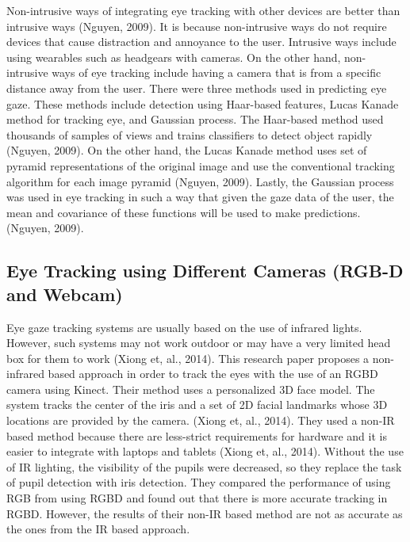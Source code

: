 Non-intrusive ways of integrating eye tracking with other devices are better than intrusive ways (Nguyen, 2009). It is because non-intrusive ways do not require devices that cause distraction and annoyance to the user. Intrusive ways include using wearables such as headgears with cameras. On the other hand, non-intrusive ways of eye tracking include having a camera that is from a specific distance away from the user. There were three methods used in predicting eye gaze. These methods include detection using Haar-based features, Lucas Kanade method for tracking eye, and Gaussian process. The Haar-based method used thousands of samples of views and trains classifiers to detect object rapidly (Nguyen, 2009). On the other hand, the Lucas Kanade method uses set of pyramid representations of the original image and use the conventional tracking algorithm for each image pyramid (Nguyen, 2009). Lastly, the Gaussian process was used in eye tracking in such a way that given the gaze data of the user, the mean and covariance of these functions will be used to make predictions. (Nguyen, 2009).

\subsection{Eye Tracking using Different Cameras (RGB-D and Webcam)}
Eye gaze tracking systems are usually based on the use of infrared lights. However, such systems may not work outdoor or may have a very limited head box for them to work (Xiong et, al., 2014). This research paper proposes a non-infrared based approach in order to track the eyes with the use of an RGBD camera using Kinect. Their method uses a personalized 3D face model. The system tracks the center of the iris and a set of 2D facial landmarks whose 3D locations are provided by the camera. (Xiong et, al., 2014). They used a non-IR based method because there are less-strict requirements for hardware and it is easier to integrate with laptops and tablets (Xiong et, al., 2014). Without the use of IR lighting, the visibility of the pupils were decreased, so they replace the task of pupil detection with iris detection. They compared the performance of using RGB from using RGBD and found out that there is more accurate tracking in RGBD. However, the results of their non-IR based method are not as accurate as the ones from the IR based approach. 
\newline


